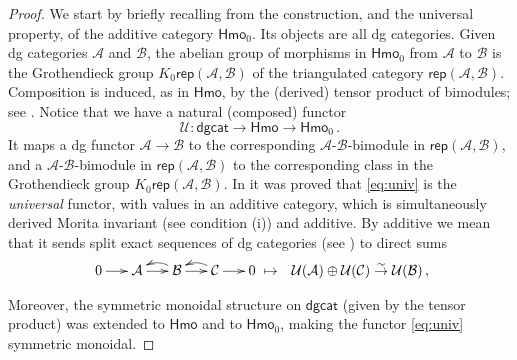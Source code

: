 \documentclass{amsart}
\numberwithin{equation}{subsection}
\theoremstyle{remark}
\theoremstyle{remark}
\theoremstyle{remark}
\theoremstyle{remark}
\begin{document}
\begin{proof}
We start by briefly recalling from \cite{IMRN} the construction, and the universal property, of the additive category ${\mathsf{Hmo}}_0$. Its objects are all dg categories. Given dg categories ${{\mathcal A}}$ and ${{\mathcal B}}$, the abelian group of morphisms in ${\mathsf{Hmo}}_0$ from ${{\mathcal A}}$ to ${{\mathcal B}}$ is the Grothendieck group $K_0{\mathsf{rep}}({{\mathcal A}}, {{\mathcal B}})$ of the triangulated category ${\mathsf{rep}}({{\mathcal A}}, {{\mathcal B}})$. Composition is induced, as in ${\mathsf{Hmo}}$, by the (derived) tensor product of bimodules; see \cite[\S6]{IMRN}. Notice that we have a natural (composed) functor
\begin{equation}\label{eq:univ}
{{\mathcal U}}: {\mathsf{dgcat}} {\longrightarrow} {\mathsf{Hmo}} {\longrightarrow} {\mathsf{Hmo}}_0\,.
\end{equation}
It maps a dg functor ${{\mathcal A}} \to {{\mathcal B}}$ to the corresponding ${{\mathcal A}}\text{-}{{\mathcal B}}$-bimodule in ${\mathsf{rep}}({{\mathcal A}}, {{\mathcal B}})$, and a ${{\mathcal A}}\text{-}{{\mathcal B}}$-bimodule in ${\mathsf{rep}}({{\mathcal A}}, {{\mathcal B}})$ to the corresponding class in the Grothendieck group $K_0{\mathsf{rep}}({{\mathcal A}}, {{\mathcal B}})$. In \cite[Theorem~6.3]{IMRN} it was proved that \eqref{eq:univ} is the {\em universal} functor, with values in an additive category, which is simultaneously derived Morita invariant (see condition (i)) and additive. By additive we mean that it sends split exact sequences of dg categories (see \cite[\S13]{Duke}) to direct sums
\begin{eqnarray}\label{eq:additivity}
\xymatrix@C=1.5em@R=1.0em{
0 \ar[r] &  {{\mathcal A}} \ar[r]  & {{\mathcal B}} \ar[r]  \ar@/_0.5pc/[l] & {{\mathcal C}} \ar[r] \ar@/_0.5pc/[l] &  0
} &\mapsto&
{{\mathcal U}}({{\mathcal A}}) \oplus {{\mathcal U}}({{\mathcal C}}) \stackrel{\sim}{\to} {{\mathcal U}}({{\mathcal B}})\,,
\end{eqnarray}

Moreover, the symmetric monoidal structure on ${\mathsf{dgcat}}$ (given by the tensor product) was extended to ${\mathsf{Hmo}}$ and to ${\mathsf{Hmo}}_0$, making the functor \eqref{eq:univ} symmetric monoidal.


\end{proof}
\end{document}
